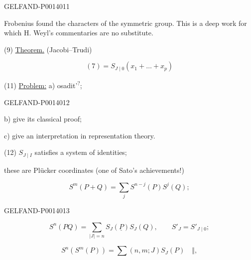 \begin{GelfandAdjacentEvidence}{GELFAND-P001401}{1}

Frobenius found the characters of the symmetric group. This is a deep work for which H. Weyl's commentaries are no substitute.

(9) \uline{Theorem.} (Jacobi–Trudi)

\begin{equation*}
(7)=S_{J\mid 0}(x_1+\ldots+x_p) \tag{10}
\end{equation*}

(11) \uline{Problem:} a)
osadit’\textsuperscript{?};

\end{GelfandAdjacentEvidence}
\begin{GelfandAdjacentEvidence}{GELFAND-P001401}{2}



b) give its classical proof;

c) give an interpretation in representation theory.

(12) \(S_{J\mid I}\) satisfies a system of identities;

these are Plücker coordinates (one of Sato's achievements!)

\begin{equation*}
S^m(P+Q)=\sum_j S^{n-j}(P)S^j(Q); \tag{13}
\end{equation*}
\end{GelfandAdjacentEvidence}
\begin{GelfandAdjacentEvidence}{GELFAND-P001401}{3}


\begin{equation*}
S^n(PQ)=\sum_{\lvert J\rvert=n}S_J(\underline{P})S_J(Q),\qquad
S'_J=S'_{J\mid 0}; \tag{14}
\end{equation*}

\begin{equation*}
S^n(S^m(P))=\sum (n,m;J)S_J(P)\quad\Vert, \tag{15}
\end{equation*}
\end{GelfandAdjacentEvidence}
